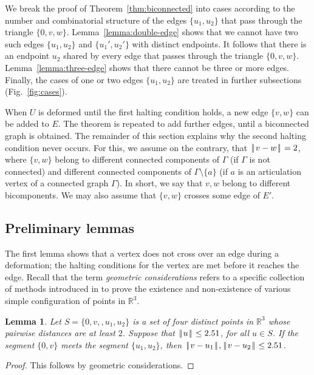 \documentclass[11pt]{amsart}
\newcommand{\ring}[1]{\mathbb{#1}}
\def\|{{\hskip0.1em|\hskip-0.15em|\hskip0.1em}}
\newtheorem{lemma}{Lemma}
\begin{document}
We break the proof of Theorem~\ref{thm:biconnected} into cases according
to the number and combinatorial structure of the edges $\{u_1,u_2\}$
that pass through the triangle $\{0,v,w\}$.
Lemma~\ref{lemma:double-edge} shows that we cannot have two such edges $\{u_1,u_2\}$ and $\{u_1',u_2'\}$ with distinct endpoints.   It follows that there is an endpoint $u_2$ shared by every edge that passes through the
triangle $\{0,v,w\}$.  Lemma~\ref{lemma:three-edge} shows that there cannot be three or more edges.  Finally, the cases of one or two edges $\{u_1,u_2\}$ are treated in further subsections (Fig.~\ref{fig:cases}).


When $U$ is deformed until the first halting condition holds, a new edge $\{v,w\}$ can be added to $E$.
The theorem is repeated to add further edges, until a biconnected graph is obtained.  
The remainder of this section explains why the second halting condition never occurs.  For
this, we assume on the contrary, that $\|v-w\|=2$, where $\{v,w\}$ belong to different connected components
of $\Gamma$ (if $\Gamma$ is not connected) and different connected components of $\Gamma\setminus\{a\}$ (if $a$
is an articulation vertex of a connected graph $\Gamma$).  In short, we say that $v,w$ belong to
different bicomponents.  We may also assume that $\{v,w\}$ crosses some edge of $E'$.

\subsection*{Preliminary lemmas}

The first lemma shows that a vertex does not cross over an edge during a deformation; the halting conditions for the vertex are met before it reaches the edge.  Recall that the term {\it geometric considerations} refers to a specific collection of methods introduced in \cite[\S4.2]{Hales:2006:DCG} to prove the existence and non-existence of various simple configuration of points in $\ring{R}^3$.

\begin{lemma} Let $S=\{0,v,,u_1,u_2\}$ is a set of four distinct points in $\ring{R}^3$ whose pairwise distances are at least $2$.  Suppose that $\|u\|\le 2.51$, for all $u\in S$.  If the segment $\{0,v\}$ meets the segment $\{u_1,u_2\}$, then $\|v-u_1\|,\|v-u_2\|\le 2.51$.
\end{lemma}

\begin{proof} This follows by geometric considerations.
\end{proof}
\end{document}
